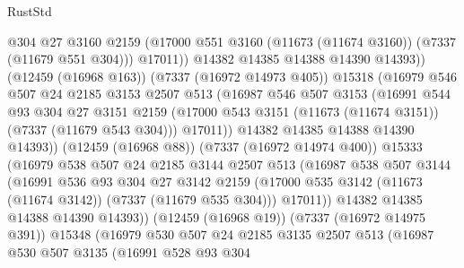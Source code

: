 \begin{lexlean}{RustStd}
\begin{coremodule}
                          @304
                          @27
                          @3160
                          @2159
                          (@17000 @551 @3160 (@11673 (@11674 @3160)) (@7337 (@11679 @551 @304)))
                          @17011))
                      @14382
                      @14385
                      @14388
                      @14390
                      @14393))
                  (@12459 (@16968 @163))
                  (@7337 (@16972 @14973 @405))
                  @15318
                  (@16979
                    @546
                    @507
                    @24
                    @2185
                    @3153
                    @2507
                    @513
                    (@16987
                      @546
                      @507
                      @3153
                      (@16991
                        @544
                        @93
                        @304
                        @27
                        @3151
                        @2159
                        (@17000 @543 @3151 (@11673 (@11674 @3151)) (@7337 (@11679 @543 @304)))
                        @17011))
                    @14382
                    @14385
                    @14388
                    @14390
                    @14393))
                (@12459 (@16968 @88))
                (@7337 (@16972 @14974 @400))
                @15333
                (@16979
                  @538
                  @507
                  @24
                  @2185
                  @3144
                  @2507
                  @513
                  (@16987
                    @538
                    @507
                    @3144
                    (@16991
                      @536
                      @93
                      @304
                      @27
                      @3142
                      @2159
                      (@17000 @535 @3142 (@11673 (@11674 @3142)) (@7337 (@11679 @535 @304)))
                      @17011))
                  @14382
                  @14385
                  @14388
                  @14390
                  @14393))
              (@12459 (@16968 @19))
              (@7337 (@16972 @14975 @391))
              @15348
              (@16979
                @530
                @507
                @24
                @2185
                @3135
                @2507
                @513
                (@16987
                  @530
                  @507
                  @3135
                  (@16991
                    @528
                    @93
                    @304

\end{coremodule}
\end{lexlean}
